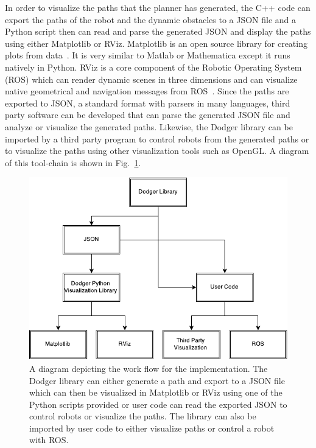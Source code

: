 In order to visualize the paths that the planner has generated, the C++ code
can export the paths of the robot and the dynamic obstacles to a JSON file and
a Python script then can read and parse the generated JSON and display the
paths using either Matplotlib or RViz. Matplotlib is an open source library for
creating plots from data~\cite{matplotlib}. It is very similar to Matlab or
Mathematica except it runs natively in Python. RViz is a core component of the
Robotic Operating System (ROS) which can render dynamic scenes in three
dimensions and can visualize native geometrical and navigation messages from
ROS~\cite{ros}.  Since the paths are exported to JSON, a standard format with
parsers in many languages, third party software can be developed that can parse
the generated JSON file and analyze or visualize the generated paths.
Likewise, the Dodger library can be imported by a third party program to
control robots from the generated paths or to visualize the paths using other
visualization tools such as OpenGL. A diagram of this tool-chain is shown in
Fig.~\ref{fig:software}.


\begin{figure}[h!]

    \centering

    \includegraphics[width=0.8\linewidth]{figs/toolchain}

    \caption{A diagram depicting the work flow for the implementation. The
    Dodger library can either generate a path and export to a JSON file which
can then be visualized in Matplotlib or RViz using one of the Python scripts
provided or user code can read the exported JSON to control robots or visualize
the paths. The library can also be imported by user code to either visualize
paths or control a robot with ROS.}

    \label{fig:software}

\end{figure}

